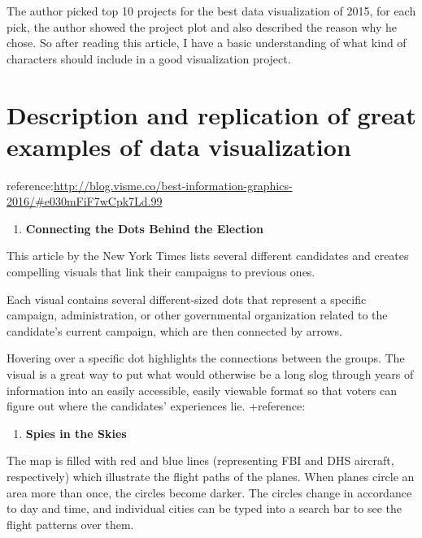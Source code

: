\documentclass[]{book}
\providecommand{\tightlist}{%
  \setlength{\itemsep}{0pt}\setlength{\parskip}{0pt}}
\theoremstyle{definition}
\theoremstyle{definition}
\theoremstyle{definition}
\theoremstyle{remark}
\begin{document}
The author picked top 10 projects for the best data visualization of
2015, for each pick, the author showed the project plot and also
described the reason why he chose. So after reading this article, I have
a basic understanding of what kind of characters should include in a
good visualization project.

\section{Description and replication of great examples of data
visualization}\label{description-and-replication-of-great-examples-of-data-visualization}

reference:\url{http://blog.visme.co/best-information-graphics-2016/\#e030mFiF7wCpk7Ld.99}

\begin{enumerate}
\def\labelenumi{\arabic{enumi}.}
\tightlist
\item
  \textbf{Connecting the Dots Behind the Election}
\end{enumerate}

This article by the New York Times lists several different candidates
and creates compelling visuals that link their campaigns to previous
ones.

Each visual contains several different-sized dots that represent a
specific campaign, administration, or other governmental organization
related to the candidate's current campaign, which are then connected by
arrows.

Hovering over a specific dot highlights the connections between the
groups. The visual is a great way to put what would otherwise be a long
slog through years of information into an easily accessible, easily
viewable format so that voters can figure out where the candidates'
experiences lie. +reference: \citep{campaign_staff}

\begin{enumerate}
\def\labelenumi{\arabic{enumi}.}
\setcounter{enumi}{1}
\tightlist
\item
  \textbf{Spies in the Skies}
\end{enumerate}

The map is filled with red and blue lines (representing FBI and DHS
aircraft, respectively) which illustrate the flight paths of the planes.
When planes circle an area more than once, the circles become darker.
The circles change in accordance to day and time, and individual cities
can be typed into a search bar to see the flight patterns over them.
\end{document}
